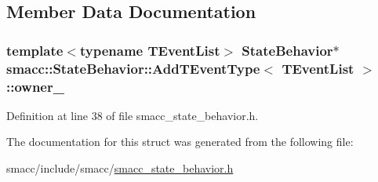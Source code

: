 \subsection{Member Data Documentation}
\subsubsection[{\texorpdfstring{owner\+\_\+}{owner_}}]{\setlength{\rightskip}{0pt plus 5cm}template$<$typename T\+Event\+List$>$ {\bf State\+Behavior}$\ast$ {\bf smacc\+::\+State\+Behavior\+::\+Add\+T\+Event\+Type}$<$ T\+Event\+List $>$\+::owner\+\_\+}\hypertarget{structsmacc_1_1StateBehavior_1_1AddTEventType_a7d06c5a45060d031939e787d2cfddff3}{}\label{structsmacc_1_1StateBehavior_1_1AddTEventType_a7d06c5a45060d031939e787d2cfddff3}


Definition at line 38 of file smacc\+\_\+state\+\_\+behavior.\+h.



The documentation for this struct was generated from the following file\+:\begin{DoxyCompactItemize}
\item 
smacc/include/smacc/\hyperlink{smacc__state__behavior_8h}{smacc\+\_\+state\+\_\+behavior.\+h}\end{DoxyCompactItemize}
